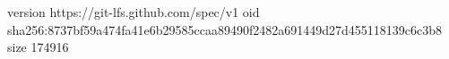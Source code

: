 version https://git-lfs.github.com/spec/v1
oid sha256:8737bf59a474fa41e6b29585ccaa89490f2482a691449d27d455118139c6c3b8
size 174916
